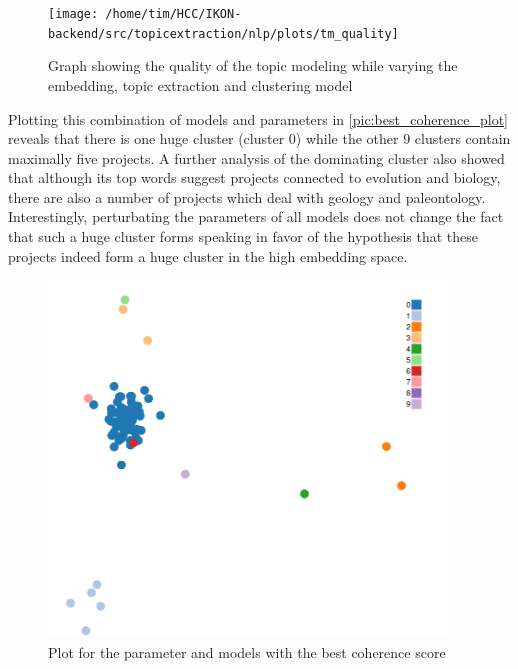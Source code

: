 \begin{figure}[t]
	\centering
	\texttt{[image: /home/tim/HCC/IKON-backend/src/topicextraction/nlp/plots/tm\_quality]}
	\caption{\label{pic:tm_quality} Graph showing the quality of the topic modeling while varying the embedding, topic extraction and clustering model}
\end{figure}

Plotting this combination of models and parameters in \autoref{pic:best_coherence_plot} reveals that there is one huge cluster (cluster 0) while the other 9 clusters contain maximally five projects. A further analysis of the dominating cluster also showed that although its top words suggest projects connected to evolution and biology, there are also a number of projects which deal with geology and paleontology. Interestingly, perturbating the parameters of all models does not change the fact that such a huge cluster forms speaking in favor of the hypothesis that these projects indeed form a huge cluster in the high embedding space.

\begin{figure}[t]
	\centering
	\includegraphics[width=400px]{../chapters/implementation/pics/best_coherence_plot}
	\caption{\label{pic:best_coherence_plot} Plot for the parameter and models with the best coherence score}
\end{figure}

